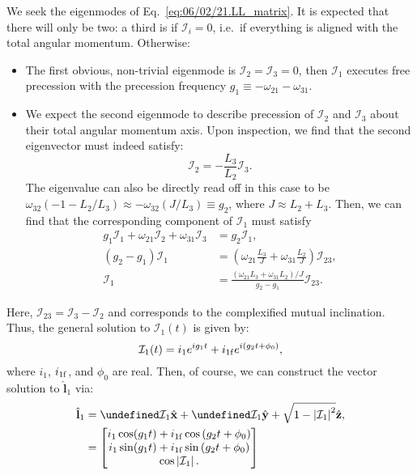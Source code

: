 \documentclass[11pt,
        usenames, %
        dvipsnames %
    ]{article}
\newcommand*{\bm}[1]{\boldsymbol{\mathbf{#1}}}
\newcommand*{\uv}[1]{\hat{\bm{#1}}}
\newcommand*{\abs}[1]{\left|#1\right|}
\newcommand*{\p}[1]{\left(#1\right)}
\let\Re\undefined
\let\Im\undefined
\DeclareMathOperator{\Re}{Re}
\DeclareMathOperator{\Im}{Im}
\begin{document}
We seek the eigenmodes of Eq.~\eqref{eq:06/02/21.LL_matrix}. It is expected that
there will only be two: a third is if $\mathcal{I}_i = 0$, i.e.\ if everything
is aligned with the total angular momentum. Otherwise:
\begin{itemize}
    \item The first obvious, non-trivial eigenmode is $\mathcal{I}_2 =
        \mathcal{I}_3 = 0$, then $\mathcal{I}_1$ executes free precession with
        the precession frequency $g_1 \equiv -\omega_{21} - \omega_{31}$.

    \item We expect the second eigenmode to describe precession of
        $\mathcal{I}_2$ and $\mathcal{I}_3$ about their total angular momentum
        axis. Upon inspection, we find that the second eigenvector must indeed
        satisfy:
        \begin{equation}
            \mathcal{I}_2 = -\frac{L_3}{L_2}\mathcal{I}_3.
        \end{equation}
        The eigenvalue can also be directly read off in this case to be
        $\omega_{32}\p{-1 - L_2/L_3} \approx -\omega_{32}(J / L_3) \equiv g_2$,
        where $J \approx L_2 + L_3$. Then, we can find that the corresponding
        component of $\mathcal{I}_1$ must satisfy
        \begin{align}
            g_1\mathcal{I}_1
                + \omega_{21}\mathcal{I}_2 + \omega_{31}\mathcal{I}_3
                &= g_2\mathcal{I}_1,\\
            \p{g_2 - g_1}\mathcal{I}_1 &=
                \p{\omega_{21}\frac{L_3}{J}
                    + \omega_{31}\frac{L_2}{J}}\mathcal{I}_{23},\\
            \mathcal{I}_1 &= \frac{\p{\omega_{21}L_3
                    + \omega_{31}L_2} / J}{g_2 - g_1}\mathcal{I}_{23}.
        \end{align}
\end{itemize}
Here, $\mathcal{I}_{23} = \mathcal{I}_3 - \mathcal{I}_2$ and corresponds to the
complexified mutual inclination. Thus, the general solution to
$\mathcal{I}_1(t)$ is given by:
\begin{equation}
    \mathcal{I}_1(t) = i_1e^{ig_1t} + i_{\rm 1f}e^{i(g_2t + \phi_0)},
\end{equation}
where $i_1$, $i_{\rm 1f}$, and $\phi_0$ are real. Then, of course, we can
construct the vector solution to $\uv{l}_1$ via:
\begin{align}
    \uv{l}_1 &= \Re \mathcal{I}_1\uv{x}
            + \Im \mathcal{I}_1 \uv{y}
            + \sqrt{1 - \abs{\mathcal{I}_1}^2}
            \uv{z},\label{eq:06/02/21.l1param}\\
        &= \begin{bmatrix}
            i_1 \cos (g_1t) + i_{\rm 1f} \cos\p{g_2 t + \phi_0}\\
            i_1 \sin (g_1t) + i_{\rm 1f} \sin\p{g_2 t + \phi_0}\\
            \cos\abs{\mathcal{I}_1}.\nonumber
        \end{bmatrix}
\end{align}
\end{document}
